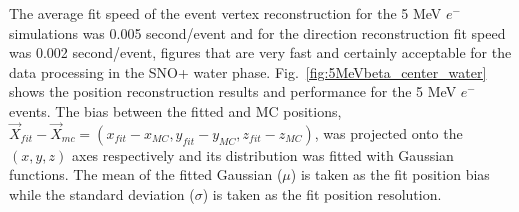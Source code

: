 The average fit speed of the event vertex reconstruction for the 5 MeV $e^-$ simulations was 0.005 second/event and for the direction reconstruction fit speed was 0.002 second/event, figures that are very fast and certainly acceptable for the data processing in the SNO+ water phase. Fig.~\ref{fig:5MeVbeta_center_water} shows the position reconstruction results and performance for the 5 MeV $e^-$ events. The bias between the fitted and MC positions, $\vec{X}_{fit}-\vec{X}_{mc}=(x_{fit}-x_{MC},y_{fit}-y_{MC},z_{fit}-z_{MC})$, was projected onto the $(x,y,z)$ axes respectively and its distribution was fitted with Gaussian functions. The mean of the fitted Gaussian ($\mu$) is taken as the fit position bias while the standard deviation ($\sigma$) is taken as the fit position resolution.
\begin{figure}[htbp]
	\centering 
\end{figure}
